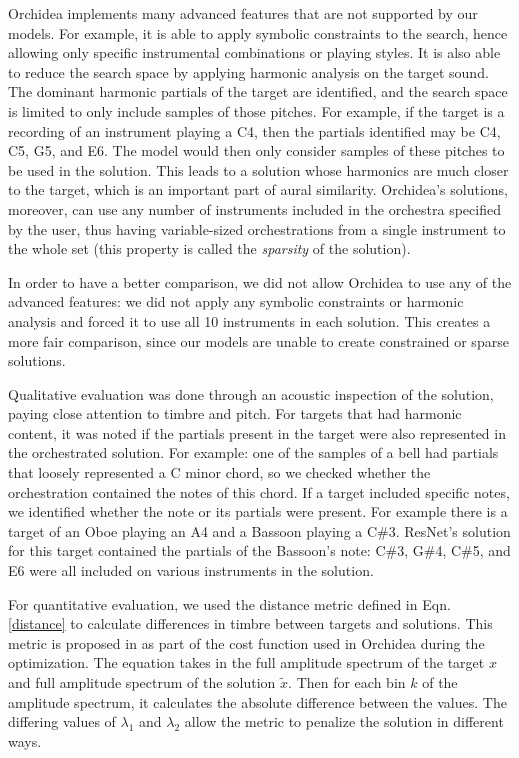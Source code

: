 \documentclass[runningheads,a4paper]{llncs}
\begin{document}
Orchidea implements many advanced features that are not supported by our models. For example, it is able to apply symbolic constraints to the search, hence allowing only specific instrumental combinations or playing styles. It is also able to reduce the search space by applying harmonic analysis on the target sound. The dominant harmonic partials of the target are identified, and the search space is limited to only include samples of those pitches. For example, if the target is a recording of an instrument playing a C4, then the partials identified may be C4, C5, G5, and E6. The model would then only consider samples of these pitches to be used in the solution. This leads to a solution whose harmonics are much closer to the target, which is an important part of aural similarity. Orchidea's solutions, moreover, can use any number of instruments included in the orchestra specified by the user, thus having variable-sized orchestrations from a single instrument to the whole set (this property is called the \emph{sparsity} of the solution).

In order to have a better comparison, we did not allow Orchidea to use any of the advanced features: we did not apply any symbolic constraints or harmonic analysis and forced it to use all 10 instruments in each solution. This creates a more fair comparison, since our models are unable to create constrained or sparse solutions.

Qualitative evaluation was done through an acoustic inspection of the solution, paying close attention to timbre and pitch. For targets that had harmonic content, it was noted if the partials present in the target were also represented in the orchestrated solution. For example: one of the samples of a bell had partials that loosely represented a C minor chord, so we checked whether the orchestration contained the notes of this chord. If a target included specific notes, we identified whether the note or its partials were present. For example there is a target of an Oboe playing an A4 and a Bassoon playing a C\#3. ResNet's solution for this target contained the partials of the Bassoon's note: C\#3, G\#4, C\#5, and E6 were all included on various instruments in the solution.

For quantitative evaluation, we used the distance metric defined in Eqn. \ref{distance} to calculate differences in timbre between targets and solutions. This metric is proposed in \cite{Cella2020} as part of the cost function used in Orchidea during the optimization. The equation takes in the full amplitude spectrum of the target $x$ and full amplitude spectrum of the solution $\tilde{x}$. Then for each bin $k$ of the amplitude spectrum, it calculates the absolute difference between the values. The differing values of $\lambda_1$ and $\lambda_2$ allow the metric to penalize the solution in different ways.
\end{document}
